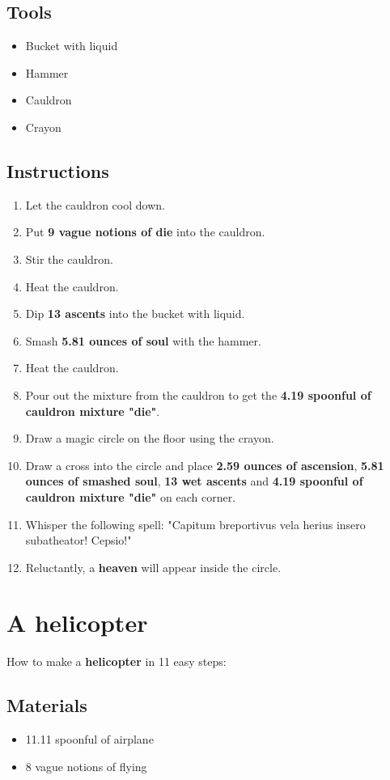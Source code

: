 \documentclass{article}
\begin{document}
\subsection{Tools}\begin{itemize}
\item 
Bucket with liquid
\item 
Hammer
\item 
Cauldron
\item 
Crayon
\end{itemize}
\subsection{Instructions}\begin{enumerate}
\item 
Let the cauldron cool down.
\item 
Put \textbf{9 vague notions of die} into the cauldron.
\item 
Stir the cauldron.
\item 
Heat the cauldron.
\item 
Dip \textbf{13 ascents} into the bucket with liquid.
\item 
Smash \textbf{5.81 ounces of soul} with the hammer.
\item 
Heat the cauldron.
\item 
Pour out the mixture from the cauldron to get the \textbf{4.19 spoonful of cauldron mixture "die"}.
\item 
Draw a magic circle on the floor using the crayon.
\item 
Draw a cross into the circle and place \textbf{2.59 ounces of ascension}, \textbf{5.81 ounces of smashed soul}, \textbf{13 wet ascents} and \textbf{4.19 spoonful of cauldron mixture "die"} on each corner.
\item 
Whisper the following spell: "Capitum breportivus vela herius insero subatheator! Cepsio!"
\item 
Reluctantly, a \textbf{heaven} will appear inside the circle.
\end{enumerate}
\newpage
\section{A helicopter}How to make a \textbf{helicopter} in 11 easy steps:

\subsection{Materials}\begin{itemize}
\item 
11.11 spoonful of airplane
\item 
8 vague notions of flying
\end{itemize}
\end{document}

